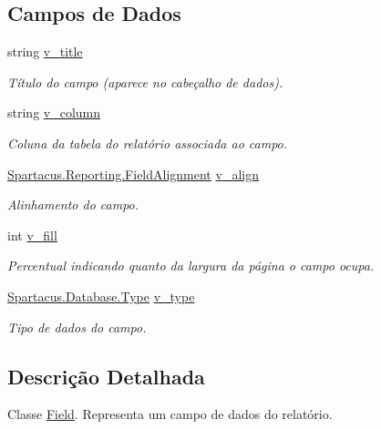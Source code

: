 \subsection*{Campos de Dados}
\begin{DoxyCompactItemize}
\item 
string \hyperlink{classSpartacus_1_1Reporting_1_1Field_ad450139065a85c8b7fcf246512ed9a2d}{v\+\_\+title}
\begin{DoxyCompactList}\small\item\em Título do campo (aparece no cabeçalho de dados). \end{DoxyCompactList}\item 
string \hyperlink{classSpartacus_1_1Reporting_1_1Field_a7b3f80ad43dd20df542a16ebba7412f0}{v\+\_\+column}
\begin{DoxyCompactList}\small\item\em Coluna da tabela do relatório associada ao campo. \end{DoxyCompactList}\item 
\hyperlink{namespaceSpartacus_1_1Reporting_a1b74021bf4e6e2fe6eac8a1aebddd05e}{Spartacus.\+Reporting.\+Field\+Alignment} \hyperlink{classSpartacus_1_1Reporting_1_1Field_a4f85d01265d76fb113faf70ea58333da}{v\+\_\+align}
\begin{DoxyCompactList}\small\item\em Alinhamento do campo. \end{DoxyCompactList}\item 
int \hyperlink{classSpartacus_1_1Reporting_1_1Field_ae8b88bec5cb5519800c17ca5c415994a}{v\+\_\+fill}
\begin{DoxyCompactList}\small\item\em Percentual indicando quanto da largura da página o campo ocupa. \end{DoxyCompactList}\item 
\hyperlink{namespaceSpartacus_1_1Database_a9d4c2be7c9bc257b8d34c84b43e5ec32}{Spartacus.\+Database.\+Type} \hyperlink{classSpartacus_1_1Reporting_1_1Field_a118afbb0d22ccc14aacd8d2b1a048707}{v\+\_\+type}
\begin{DoxyCompactList}\small\item\em Tipo de dados do campo. \end{DoxyCompactList}\end{DoxyCompactItemize}


\subsection{Descrição Detalhada}
Classe \hyperlink{classSpartacus_1_1Reporting_1_1Field}{Field}. Representa um campo de dados do relatório. 



